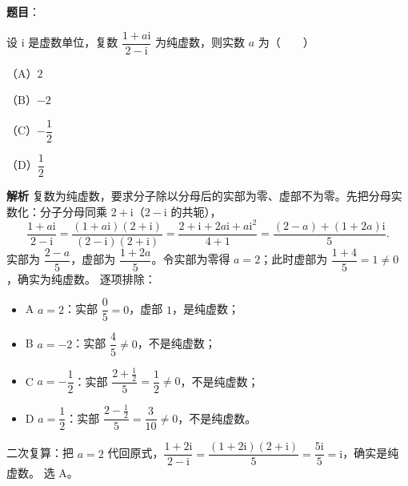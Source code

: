 \begin{answer}

\textbf{题目}：

设 $\mathrm i$ 是虚数单位，复数 $\dfrac{1+a\mathrm i}{2-\mathrm i}$ 为纯虚数，则实数 $a$ 为\mbox{（　　）}

（A）$2$

（B）$-2$

（C）$-\dfrac12$

（D）$\dfrac12$

\textbf{解析}
复数为纯虚数，要求分子除以分母后的实部为零、虚部不为零。先把分母实数化：分子分母同乘 $2+\mathrm i$（$2-\mathrm i$ 的共轭），
\nopagebreak[4]
\[
\frac{1+a\mathrm i}{2-\mathrm i}=\frac{(1+a\mathrm i)(2+\mathrm i)}{(2-\mathrm i)(2+\mathrm i)}
=\frac{2+\mathrm i+2a\mathrm i+a\mathrm i^2}{4+1}
=\frac{(2-a)+(1+2a)\mathrm i}{5}.
\]
实部为 $\dfrac{2-a}{5}$，虚部为 $\dfrac{1+2a}{5}$。令实部为零得 $a=2$；此时虚部为 $\dfrac{1+4}{5}=1\neq0$，确实为纯虚数。
逐项排除：
\begin{itemize}
\item A $a=2$：实部 $\dfrac{0}{5}=0$，虚部 $1$，是纯虚数；
\item B $a=-2$：实部 $\dfrac{4}{5}\neq0$，不是纯虚数；
\item C $a=-\dfrac12$：实部 $\dfrac{2+\frac12}{5}=\dfrac12\neq0$，不是纯虚数；
\item D $a=\dfrac12$：实部 $\dfrac{2-\frac12}{5}=\dfrac{3}{10}\neq0$，不是纯虚数。
\end{itemize}
二次复算：把 $a=2$ 代回原式，$\dfrac{1+2\mathrm i}{2-\mathrm i}=\dfrac{(1+2\mathrm i)(2+\mathrm i)}{5}=\dfrac{5\mathrm i}{5}=\mathrm i$，确实是纯虚数。
选 A。


\end{answer}

